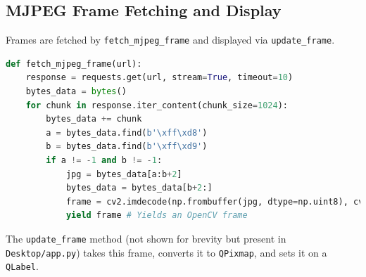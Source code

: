 \documentclass[12pt, a4paper]{report}
\begin{document}
\subsection{MJPEG Frame Fetching and Display}
Frames are fetched by \texttt{fetch\_mjpeg\_frame} and displayed via \texttt{update\_frame}.
\begin{lstlisting}[language=Python, caption={PyQt6 MJPEG Frame Fetching Snippet}, label={lst:pyqt_fetch_ch4}] % Changed label
def fetch_mjpeg_frame(url):
    response = requests.get(url, stream=True, timeout=10)
    bytes_data = bytes()
    for chunk in response.iter_content(chunk_size=1024):
        bytes_data += chunk
        a = bytes_data.find(b'\xff\xd8')
        b = bytes_data.find(b'\xff\xd9')
        if a != -1 and b != -1:
            jpg = bytes_data[a:b+2]
            bytes_data = bytes_data[b+2:]
            frame = cv2.imdecode(np.frombuffer(jpg, dtype=np.uint8), cv2.IMREAD_COLOR)
            yield frame # Yields an OpenCV frame
\end{lstlisting}
The \texttt{update\_frame} method (not shown for brevity but present in \texttt{Desktop/app.py}) takes this frame, converts it to \texttt{QPixmap}, and sets it on a \texttt{QLabel}.
\end{document}
